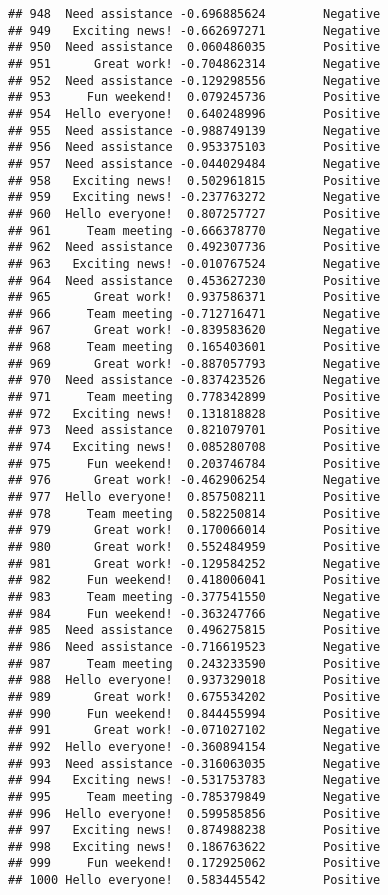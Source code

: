 \documentclass[
]{article}
\begin{document}
\begin{verbatim}
## 948  Need assistance -0.696885624        Negative
## 949   Exciting news! -0.662697271        Negative
## 950  Need assistance  0.060486035        Positive
## 951      Great work! -0.704862314        Negative
## 952  Need assistance -0.129298556        Negative
## 953     Fun weekend!  0.079245736        Positive
## 954  Hello everyone!  0.640248996        Positive
## 955  Need assistance -0.988749139        Negative
## 956  Need assistance  0.953375103        Positive
## 957  Need assistance -0.044029484        Negative
## 958   Exciting news!  0.502961815        Positive
## 959   Exciting news! -0.237763272        Negative
## 960  Hello everyone!  0.807257727        Positive
## 961     Team meeting -0.666378770        Negative
## 962  Need assistance  0.492307736        Positive
## 963   Exciting news! -0.010767524        Negative
## 964  Need assistance  0.453627230        Positive
## 965      Great work!  0.937586371        Positive
## 966     Team meeting -0.712716471        Negative
## 967      Great work! -0.839583620        Negative
## 968     Team meeting  0.165403601        Positive
## 969      Great work! -0.887057793        Negative
## 970  Need assistance -0.837423526        Negative
## 971     Team meeting  0.778342899        Positive
## 972   Exciting news!  0.131818828        Positive
## 973  Need assistance  0.821079701        Positive
## 974   Exciting news!  0.085280708        Positive
## 975     Fun weekend!  0.203746784        Positive
## 976      Great work! -0.462906254        Negative
## 977  Hello everyone!  0.857508211        Positive
## 978     Team meeting  0.582250814        Positive
## 979      Great work!  0.170066014        Positive
## 980      Great work!  0.552484959        Positive
## 981      Great work! -0.129584252        Negative
## 982     Fun weekend!  0.418006041        Positive
## 983     Team meeting -0.377541550        Negative
## 984     Fun weekend! -0.363247766        Negative
## 985  Need assistance  0.496275815        Positive
## 986  Need assistance -0.716619523        Negative
## 987     Team meeting  0.243233590        Positive
## 988  Hello everyone!  0.937329018        Positive
## 989      Great work!  0.675534202        Positive
## 990     Fun weekend!  0.844455994        Positive
## 991      Great work! -0.071027102        Negative
## 992  Hello everyone! -0.360894154        Negative
## 993  Need assistance -0.316063035        Negative
## 994   Exciting news! -0.531753783        Negative
## 995     Team meeting -0.785379849        Negative
## 996  Hello everyone!  0.599585856        Positive
## 997   Exciting news!  0.874988238        Positive
## 998   Exciting news!  0.186763622        Positive
## 999     Fun weekend!  0.172925062        Positive
## 1000 Hello everyone!  0.583445542        Positive
\end{verbatim}
\end{document}
